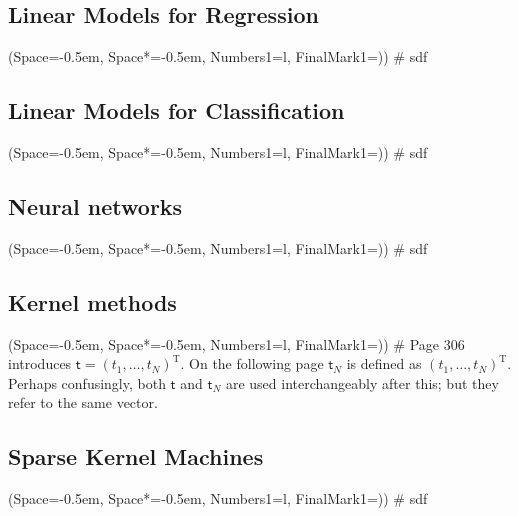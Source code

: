 \documentclass[12pt, a4paper]{article}
\newcommand{\listSpace}{-0.5em}%
\begin{document}
\subsection{Linear Models for Regression}
\begin{easylist}[itemize]
	\ListProperties(Space=\listSpace, Space*=\listSpace, Numbers1=l, FinalMark1={)})
	# sdf
\end{easylist}

\subsection{Linear Models for Classification}
\begin{easylist}[itemize]
	\ListProperties(Space=\listSpace, Space*=\listSpace, Numbers1=l, FinalMark1={)})
	# sdf
\end{easylist}

\subsection{Neural networks}
\begin{easylist}[itemize]
	\ListProperties(Space=\listSpace, Space*=\listSpace, Numbers1=l, FinalMark1={)})
	# sdf
\end{easylist}

\subsection{Kernel methods}
\begin{easylist}[itemize]
	\ListProperties(Space=\listSpace, Space*=\listSpace, Numbers1=l, FinalMark1={)})
	# Page 306 introduces $\mathsf{t} = (t_1, \ldots, t_N)^{\operatorname{T}}$.
	On the following page $\mathsf{t}_N$ is defined as $(t_1, \ldots, t_N)^{\operatorname{T}}$.
	Perhaps confusingly, both $\mathsf{t}$ and $\mathsf{t}_N$ are used interchangeably after this; but they refer to the same vector.
\end{easylist}

\subsection{Sparse Kernel Machines}
\begin{easylist}[itemize]
	\ListProperties(Space=\listSpace, Space*=\listSpace, Numbers1=l, FinalMark1={)})
	# sdf
\end{easylist}
\end{document}
